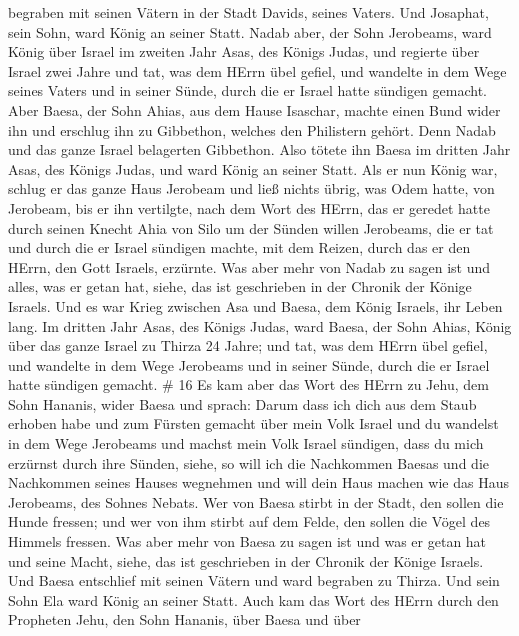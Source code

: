 begraben mit seinen Vätern in der Stadt Davids, seines Vaters. Und
Josaphat, sein Sohn, ward König an seiner Statt.  Nadab
aber, der Sohn Jerobeams, ward König über Israel im zweiten Jahr Asas,
des Königs Judas, und regierte über Israel zwei Jahre  und
tat, was dem HErrn übel gefiel, und wandelte in dem Wege seines Vaters
und in seiner Sünde, durch die er Israel hatte sündigen gemacht.
 Aber Baesa, der Sohn Ahias, aus dem Hause Isaschar, machte
einen Bund wider ihn und erschlug ihn zu Gibbethon, welches den
Philistern gehört. Denn Nadab und das ganze Israel belagerten Gibbethon.
 Also tötete ihn Baesa im dritten Jahr Asas, des Königs
Judas, und ward König an seiner Statt.  Als er nun König
war, schlug er das ganze Haus Jerobeam und ließ nichts übrig, was Odem
hatte, von Jerobeam, bis er ihn vertilgte, nach dem Wort des HErrn, das
er geredet hatte durch seinen Knecht Ahia von Silo  um der
Sünden willen Jerobeams, die er tat und durch die er Israel sündigen
machte, mit dem Reizen, durch das er den HErrn, den Gott Israels,
erzürnte.  Was aber mehr von Nadab zu sagen ist und alles,
was er getan hat, siehe, das ist geschrieben in der Chronik der Könige
Israels.  Und es war Krieg zwischen Asa und Baesa, dem
König Israels, ihr Leben lang.  Im dritten Jahr Asas, des
Königs Judas, ward Baesa, der Sohn Ahias, König über das ganze Israel zu
Thirza 24 Jahre;  und tat, was dem HErrn übel gefiel, und
wandelte in dem Wege Jerobeams und in seiner Sünde, durch die er Israel
hatte sündigen gemacht. \# 16  Es kam aber das Wort des
HErrn zu Jehu, dem Sohn Hananis, wider Baesa und sprach: 
Darum dass ich dich aus dem Staub erhoben habe und zum Fürsten gemacht
über mein Volk Israel und du wandelst in dem Wege Jerobeams und machst
mein Volk Israel sündigen, dass du mich erzürnst durch ihre Sünden,
 siehe, so will ich die Nachkommen Baesas und die Nachkommen
seines Hauses wegnehmen und will dein Haus machen wie das Haus
Jerobeams, des Sohnes Nebats.  Wer von Baesa stirbt in der
Stadt, den sollen die Hunde fressen; und wer von ihm stirbt auf dem
Felde, den sollen die Vögel des Himmels fressen.  Was aber
mehr von Baesa zu sagen ist und was er getan hat und seine Macht, siehe,
das ist geschrieben in der Chronik der Könige Israels.  Und
Baesa entschlief mit seinen Vätern und ward begraben zu Thirza. Und sein
Sohn Ela ward König an seiner Statt.  Auch kam das Wort des
HErrn durch den Propheten Jehu, den Sohn Hananis, über Baesa und über
